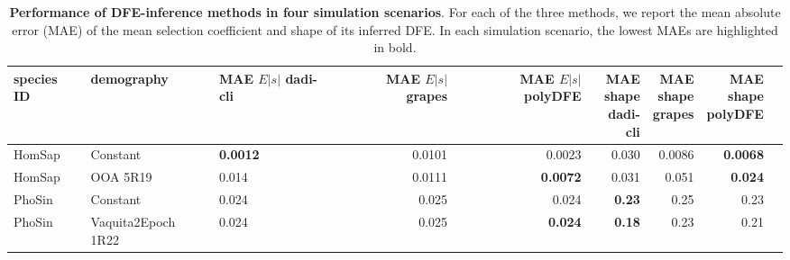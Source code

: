 \documentclass[hidelinks]{article}
\begin{document}
\begin{table}[h]
\centering
\small

\caption{\textbf{Performance of DFE-inference methods in four simulation scenarios}.
For each of the three methods, we report the mean absolute error (MAE) of the mean selection coefficient and shape of its inferred DFE.
In each simulation scenario, the lowest MAEs are highlighted in bold.}

\begin{tabular}{lllrrrrrr}
\toprule
species ID & demography & \makecell{MAE \\ $E|s|$ \\ dadi-cli} & \makecell{MAE \\ $E|s|$ \\ grapes} & \makecell{MAE \\ $E|s|$ \\ polyDFE} & \makecell{MAE \\ shape \\ dadi-cli} & \makecell{MAE \\ shape \\ grapes} & \makecell{MAE \\ shape \\ polyDFE} \\
\midrule
HomSap & Constant  & \bf{0.0012} & 0.0101 & 0.0023 & 0.030 & 0.0086 & \bf{0.0068} \\
HomSap & OOA 5R19  & 0.014 & 0.0111 & \bf{0.0072} & 0.031 & 0.051 & \bf{0.024} \\
PhoSin & Constant  & 0.024 & 0.025 & 0.024 & \bf{0.23} & 0.25 & 0.23 \\
PhoSin & Vaquita2Epoch 1R22  & 0.024 & 0.025 & \bf{0.024} & \bf{0.18} & 0.23 & 0.21 \\
\bottomrule
\end{tabular}
\label{tab:dfe_table}
\end{table}
\end{document}
